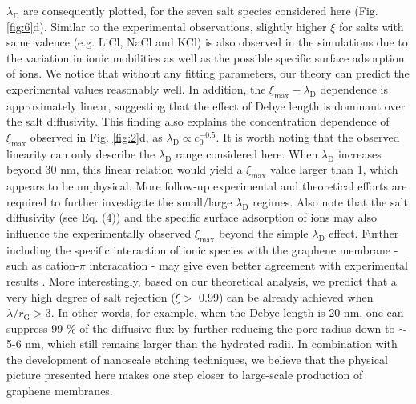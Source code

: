 \documentclass[journal=nalefd,email=true, hyperref=true, keywords=false]{achemso}
\newcommand{\Fig}{Fig.}
\renewcommand*{\textcolor}[2]{#2}
\begin{document}
$\lambda_{\mathrm{D}}$ are consequently plotted, for the seven salt
species considered here (\Fig{} \ref{fig:6}d).  \textcolor{blue}{
  Similar to the experimental observations, slightly higher $\xi$ for
  salts with same valence (e.g. LiCl, NaCl and KCl) is also observed
  in the simulations due to the variation in ionic mobilities as well
  as the possible specific surface adsorption of ions.} We notice that
without any fitting parameters, our theory can predict the
experimental values reasonably well.  In addition, the
$\xi_{\mathrm{max}}-\lambda_{\mathrm{D}}$ dependence is approximately
linear, suggesting that the effect of Debye length is dominant over
the salt diffusivity.
This
finding also explains the concentration dependence of
$\xi_{\mathrm{max}}$ observed in \Fig{} \ref{fig:2}d, as
$\lambda_{\mathrm{D}} \propto c_{0}^{-0.5}$.
\textcolor{blue}{It is worth noting that the
  observed linearity can only describe the $\lambda_{\mathrm{D}}$
  range considered here. When $\lambda_{\mathrm{D}}$ increases beyond
  30 nm, this linear relation would yield a $\xi_{\mathrm{max}}$
  value larger than 1, which appears to be unphysical.  More follow-up
  experimental and theoretical efforts are required to further
  investigate the small/large $\lambda_{\mathrm{D}}$ regimes. Also
  note that the salt diffusivity (see Eq. (4)) and the specific
  surface adsorption of ions may also influence the experimentally
  observed $\xi_{\mathrm{max}}$ beyond the simple
  $\lambda_{\mathrm{D}}$ effect.}
 Further including the
specific interaction of ionic species with the graphene membrane {-
  such as cation-$\pi$ interacation \cite{shi2013ion}} - may give even
better agreement with experimental results \cite{Ghosh_2018}. More
interestingly, based on our theoretical analysis, we predict that a
very high degree of salt rejection ($\xi>$ 0.99) can be already
achieved when $\lambda / r_{\mathrm{G}}>$3. In other words, for
example, when the Debye length is 20 nm, one can suppress 99 \% of the
diffusive flux by further reducing the pore radius down to $\sim$5-6
nm, which still remains larger than the hydrated radii. In combination
with the development of nanoscale etching techniques, we believe that
the physical picture presented here makes one step closer to
large-scale production of graphene membranes.
\end{document}
